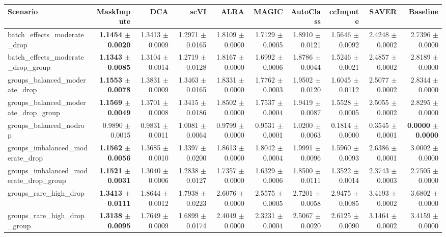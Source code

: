 \begin{tabular}{@{}lrrrrrrrrr@{}}
\toprule
Scenario & MaskImpute & DCA & scVI & ALRA & MAGIC & AutoClass & ccImpute & SAVER & Baseline \\
\midrule
batch\_effects\_moderate\_drop & \textbf{1.1454 $\pm$ 0.0020} & 1.3413 $\pm$ 0.0009 & 1.2971 $\pm$ 0.0165 & 1.8109 $\pm$ 0.0000 & 1.7129 $\pm$ 0.0005 & 1.8910 $\pm$ 0.0121 & 1.5646 $\pm$ 0.0092 & 2.4248 $\pm$ 0.0002 & 2.7396 $\pm$ 0.0000 \\
batch\_effects\_moderate\_drop\_group & \textbf{1.1343 $\pm$ 0.0085} & 1.3104 $\pm$ 0.0014 & 1.2719 $\pm$ 0.0128 & 1.8167 $\pm$ 0.0000 & 1.6992 $\pm$ 0.0006 & 1.8786 $\pm$ 0.0044 & 1.5246 $\pm$ 0.0021 & 2.4857 $\pm$ 0.0002 & 2.8189 $\pm$ 0.0000 \\
groups\_balanced\_moderate\_drop & \textbf{1.1553 $\pm$ 0.0078} & 1.3831 $\pm$ 0.0009 & 1.3463 $\pm$ 0.0165 & 1.8331 $\pm$ 0.0000 & 1.7762 $\pm$ 0.0003 & 1.9502 $\pm$ 0.0120 & 1.6045 $\pm$ 0.0112 & 2.5077 $\pm$ 0.0002 & 2.8344 $\pm$ 0.0000 \\
groups\_balanced\_moderate\_drop\_group & \textbf{1.1569 $\pm$ 0.0049} & 1.3701 $\pm$ 0.0008 & 1.3415 $\pm$ 0.0186 & 1.8502 $\pm$ 0.0000 & 1.7537 $\pm$ 0.0004 & 1.9419 $\pm$ 0.0087 & 1.5528 $\pm$ 0.0005 & 2.5055 $\pm$ 0.0002 & 2.8295 $\pm$ 0.0000 \\
groups\_balanced\_nodrop & 0.9890 $\pm$ 0.0015 & 0.9831 $\pm$ 0.0011 & 1.0081 $\pm$ 0.0064 & 0.9799 $\pm$ 0.0000 & 0.9531 $\pm$ 0.0001 & 1.0200 $\pm$ 0.0063 & 0.1814 $\pm$ 0.0000 & 0.3545 $\pm$ 0.0001 & \textbf{0.0000 $\pm$ 0.0000} \\
groups\_imbalanced\_moderate\_drop & \textbf{1.1562 $\pm$ 0.0056} & 1.3685 $\pm$ 0.0010 & 1.3397 $\pm$ 0.0200 & 1.8613 $\pm$ 0.0000 & 1.8042 $\pm$ 0.0004 & 1.9991 $\pm$ 0.0096 & 1.5960 $\pm$ 0.0093 & 2.6386 $\pm$ 0.0001 & 3.0002 $\pm$ 0.0000 \\
groups\_imbalanced\_moderate\_drop\_group & \textbf{1.1521 $\pm$ 0.0031} & 1.3040 $\pm$ 0.0006 & 1.2838 $\pm$ 0.0127 & 1.7357 $\pm$ 0.0000 & 1.6329 $\pm$ 0.0006 & 1.8500 $\pm$ 0.0111 & 1.3522 $\pm$ 0.0014 & 2.3743 $\pm$ 0.0003 & 2.7505 $\pm$ 0.0000 \\
groups\_rare\_high\_drop & \textbf{1.3413 $\pm$ 0.0111} & 1.8644 $\pm$ 0.0012 & 1.7938 $\pm$ 0.0223 & 2.6076 $\pm$ 0.0000 & 2.5575 $\pm$ 0.0005 & 2.7201 $\pm$ 0.0058 & 2.9475 $\pm$ 0.0085 & 3.4193 $\pm$ 0.0002 & 3.6802 $\pm$ 0.0000 \\
groups\_rare\_high\_drop\_group & \textbf{1.3138 $\pm$ 0.0095} & 1.7649 $\pm$ 0.0009 & 1.6899 $\pm$ 0.0174 & 2.4049 $\pm$ 0.0000 & 2.3231 $\pm$ 0.0004 & 2.5067 $\pm$ 0.0020 & 2.6125 $\pm$ 0.0090 & 3.1464 $\pm$ 0.0002 & 3.4159 $\pm$ 0.0000 \\

\end{tabular}
